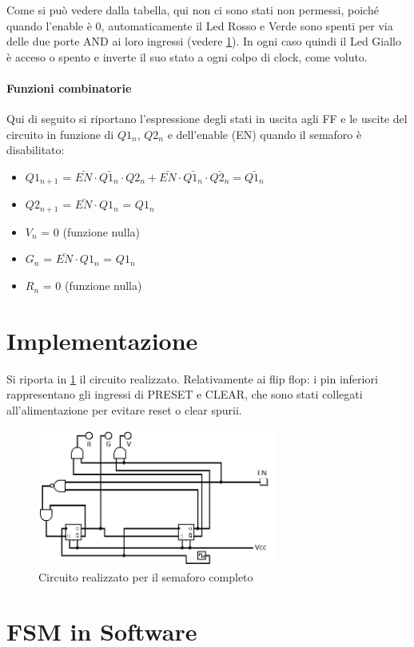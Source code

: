 \documentclass[a4paper,10pt]{article}
\begin{document}
Come si può vedere dalla tabella, qui non ci sono stati non permessi, poiché quando l'enable è 0, automaticamente il Led Rosso e Verde sono spenti per via delle due porte AND ai loro ingressi (vedere \cref{fig:circuit}). In ogni caso quindi il Led Giallo è acceso o spento e inverte il suo stato a ogni colpo di clock, come voluto.

\paragraph{Funzioni combinatorie}
Qui di seguito si riportano l'espressione degli stati in uscita agli FF e le uscite del circuito in funzione di $Q1_n$, $Q2_n$ e dell'enable (EN) quando il semaforo è disabilitato:
\begin{itemize}
\item $Q1_{n+1}$ = $\bar{EN} \cdot \bar{Q1_n} \cdot Q2_n + \bar{EN} \cdot \bar{Q1_n} \cdot \bar{Q2_n} = \bar{Q1_n}$
\item $Q2_{n+1}$ = $\bar{EN} \cdot Q1_n$ = $Q1_n$
\item $V_{n}$ = 0 (funzione nulla)
\item $G_{n}$ = $\bar{EN} \cdot Q1_n$ = $Q1_n$
\item $R_{n}$ = 0 (funzione nulla)
\end{itemize}

\section{Implementazione}

Si riporta in \cref{fig:circuit} il circuito realizzato.
Relativamente ai flip flop: i pin inferiori rappresentano gli ingressi di PRESET e CLEAR, che sono stati collegati all'alimentazione per evitare reset o clear spurii.

\begin{figure}[H]
	\centering
	\includegraphics[width=0.7\textwidth]{../grafici/circuito.png}
	\caption{Circuito realizzato per il semaforo completo}
	\label{fig:circuit}
\end{figure}

\section{FSM in Software}
\end{document}
